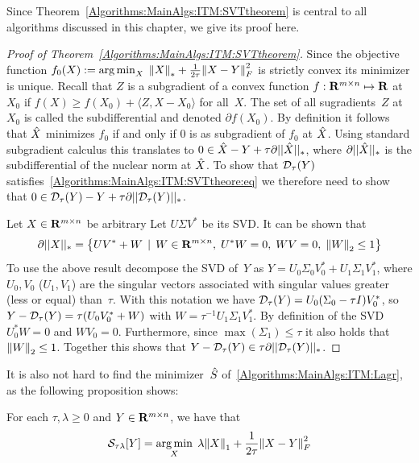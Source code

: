 \documentclass{../../common/projectreport}
\begin{document}
Since Theorem~\ref{Algorithms:MainAlgs:ITM:SVTtheorem} is central to all algorithms discussed in this chapter, we give its proof here.
%
\begin{proof}[Proof of Theorem~\ref{Algorithms:MainAlgs:ITM:SVTtheorem}] 
Since the objective function $f_0(X) := \operatorname*{arg\,min}_X \; {\left\|X\right\|}_{*}^{} + \frac{1}{2\tau} {\left\|X-Y\right\|}_{F}^{2}$ is strictly convex its minimizer is unique. Recall that $Z$ is a subgradient of a convex function $f:{\mathbf R}^{m\times n} \mapsto {\mathbf R}$ at $X_0$ if $f(X) \geq f(X_0) + \langle Z,X-X_0\rangle$ for all~$X$. The set of all sugradients~$Z$ at $X_0$ is called the subdifferential and denoted $\partial f(X_0)$. By definition it follows that ${\hat{X}}$ minimizes $f_0$ if and only if $0$ is as subgradient of $f_0$ at ${\hat{X}}$. Using standard subgradient calculus this translates to $0 \in {\hat{X}} - Y + \tau \partial ||{\hat{X}}||_{*}$, where $\partial ||{\hat{X}}||_{*}$ is the subdifferential of the nuclear norm at ${\hat{X}}$. To show that ${\mathcal{D}}_\tau(Y)$ satisfies~\eqref{Algorithms:MainAlgs:ITM:SVTtheore:eq} we therefore need to show that $0 \in {\mathcal{D}}_\tau(Y)  - Y + \tau \partial ||{\mathcal{D}}_\tau(Y) ||_{*}$.  

Let $X\in {\mathbf R}^{m\times n}$ be arbitrary Let $U\Sigma V^*$ be its SVD. It can be shown that 
\begin{align*}
\partial ||X||_{*} = \left\{ UV^*+W \,\mid\, W\in {\mathbf R}^{m\times n},\; U^*W =0,\; WV =0,\; {\left\|W\right\|}_{2}^{}\leq 1 \right\}
\end{align*}
To use the above result decompose the SVD of~$Y$ as $Y = U_0\Sigma_0V_0^* + U_1\Sigma_1V_1^*$, where $U_0,V_0$ ($U_1,V_1$) are the singular vectors associated with singular values greater (less or equal) than~$\tau$. With this notation we have ${\mathcal{D}}_\tau(Y) = U_0(\Sigma_0-\tau I)V_0^*$,  so $Y-{\mathcal{D}}_\tau(Y) = \tau (U_0V_0^*+W)$ with $W=\tau^{-1}U_1\Sigma_1V_1^*$. By definition of the SVD $U_0^*W=0$ and $WV_0=0$. Furthermore, since $\max(\Sigma_1) \leq \tau$ it also holds that ${\left\|W\right\|}_{2}^{}\leq 1$. Together this shows that $Y - {\mathcal{D}}_\tau(Y) \in \tau \partial ||{\mathcal{D}}_\tau(Y) ||_{*}$.
\end{proof}


It is also not hard to find the minimizer~${\hat{S}}$ of~\eqref{Algorithms:MainAlgs:ITM:Lagr}, as the following proposition shows:

\begin{proposition}
For each $\tau,\lambda \geq 0$ and $Y\in {\mathbf R}^{m\times n}$, we have that
\begin{align}
{\mathcal{S}}_{\tau\lambda}[Y] = \operatorname*{arg\,min}_X \; \lambda {\left\|X\right\|}_{1}^{} + \frac{1}{2\tau} {\left\|X-Y\right\|}_{F}^{2}
\label{Algorithms:MainAlgs:ITM:MVTprop:eq}
\end{align}
\label{Algorithms:MainAlgs:ITM:MVTprop}
\end{proposition}
\end{document}
